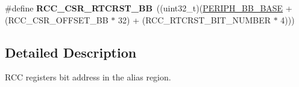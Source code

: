 \begin{DoxyCompactItemize}
\item 
\hypertarget{group___r_c_c___bit_address___alias_region_gacccd4b9a0c52d7b815ba262a002f0cc8}{\#define {\bfseries R\-C\-C\-\_\-\-C\-S\-R\-\_\-\-R\-T\-C\-R\-S\-T\-\_\-\-B\-B}~((uint32\-\_\-t)(\hyperlink{group___peripheral__memory__map_gaed7efc100877000845c236ccdc9e144a}{P\-E\-R\-I\-P\-H\-\_\-\-B\-B\-\_\-\-B\-A\-S\-E} + (R\-C\-C\-\_\-\-C\-S\-R\-\_\-\-O\-F\-F\-S\-E\-T\-\_\-\-B\-B $\ast$ 32) + (R\-C\-C\-\_\-\-R\-T\-C\-R\-S\-T\-\_\-\-B\-I\-T\-\_\-\-N\-U\-M\-B\-E\-R $\ast$ 4)))}\label{group___r_c_c___bit_address___alias_region_gacccd4b9a0c52d7b815ba262a002f0cc8}

\end{DoxyCompactItemize}


\subsection{Detailed Description}
R\-C\-C registers bit address in the alias region. 